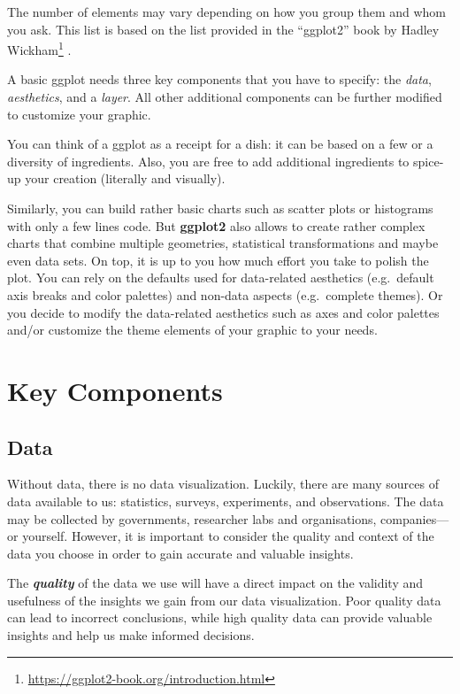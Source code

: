 \documentclass[
]{krantz}
\renewcommand{\href}[2]{#2\footnote{\url{#1}}}
\begin{document}
The number of elements may vary depending on how you group them and whom you ask. This list is based on the list provided in the \href{https://ggplot2-book.org/introduction.html}{``ggplot2'' book by Hadley Wickham} \citep{ggplot2}.

A basic ggplot needs three key components that you have to specify: the \emph{data}, \emph{aesthetics}, and a \emph{layer}. All other additional components can be further modified to customize your graphic.

You can think of a ggplot as a receipt for a dish: it can be based on a few or a diversity of ingredients. Also, you are free to add additional ingredients to spice-up your creation (literally and visually).

Similarly, you can build rather basic charts such as scatter plots or histograms with only a few lines code. But \textbf{ggplot2} also allows to create rather complex charts that combine multiple geometries, statistical transformations and maybe even data sets. On top, it is up to you how much effort you take to polish the plot. You can rely on the defaults used for data-related aesthetics (e.g.~default axis breaks and color palettes) and non-data aspects (e.g.~complete themes). Or you decide to modify the data-related aesthetics such as axes and color palettes and/or customize the theme elements of your graphic to your needs.

\hypertarget{key-components}{%
\section{Key Components}\label{key-components}}

\hypertarget{data}{%
\subsection{Data}\label{data}}

Without data, there is no data visualization. Luckily, there are many sources of data available to us: statistics, surveys, experiments, and observations. The data may be collected by governments, researcher labs and organisations, companies---or yourself. However, it is important to consider the quality and context of the data you choose in order to gain accurate and valuable insights.

The \textbf{\emph{quality}} of the data we use will have a direct impact on the validity and usefulness of the insights we gain from our data visualization. Poor quality data can lead to incorrect conclusions, while high quality data can provide valuable insights and help us make informed decisions.
\end{document}
